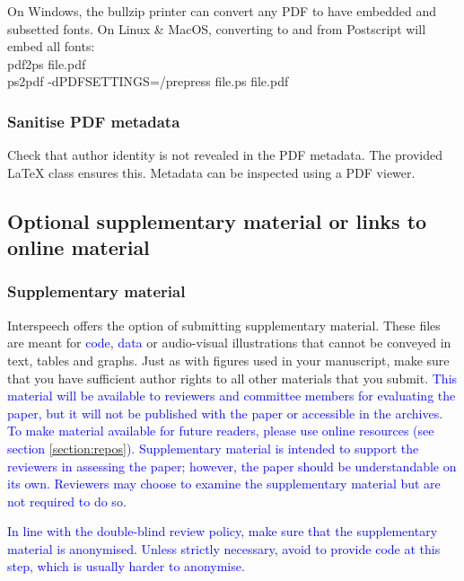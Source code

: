 \documentclass{Interspeech}
\newcommand{\blue}[1]{\textcolor{blue}{#1}}
\begin{document}
On Windows, the bullzip printer can convert any PDF to have embedded and subsetted fonts. On Linux \& MacOS, converting to and from Postscript will embed all fonts:
\\

\noindent\textsf{pdf2ps file.pdf}\\
\noindent\textsf{ps2pdf -dPDFSETTINGS=/prepress file.ps file.pdf}


\subsubsection{Sanitise PDF metadata}
\label{section:pdf_sanitise}

Check that author identity is not revealed in the PDF metadata. The provided \LaTeX\xspace class ensures this. Metadata can be inspected using a PDF viewer. 


\subsection{Optional supplementary material or links to online material}
\label{section:multimedia}

\subsubsection{Supplementary material}
\label{section:supplementary}

Interspeech offers the option of submitting supplementary material.
These files are meant for \blue{code, data} or audio-visual illustrations that cannot be conveyed in text, tables and graphs. Just as with figures used in your manuscript, make sure that you have sufficient author rights to all other materials that you submit. \blue{This material will be available to reviewers and committee members for evaluating the paper, but it will not be published with the paper or accessible in the archives. To make material available for future readers, please use online resources (see section \ref{section:repos}). Supplementary material is intended to support the reviewers in assessing the paper; however, the paper should be understandable on its own. Reviewers may choose to examine the supplementary material but are not required to do so.}

\blue{In line with the double-blind review policy, make sure that the supplementary material is anonymised. Unless strictly necessary, avoid to provide code at this step, which is usually harder to anonymise}.
\end{document}
